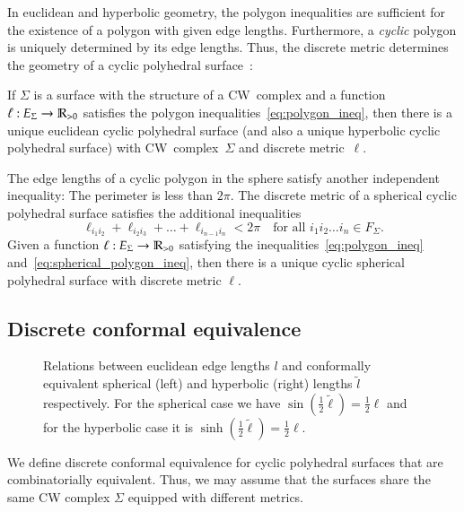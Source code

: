 \documentclass[Thesis]{subfiles}
\begin{document}
In euclidean and hyperbolic geometry, the polygon inequalities are sufficient for the existence of a polygon with given edge lengths. 
Furthermore, a \emph{cyclic} polygon is uniquely determined by its edge lengths. 
Thus, the discrete metric determines the geometry of a cyclic polyhedral surface~\cite{KSS15}:

If $\Sigma$ is a surface with the structure of a CW~complex and a function $\ell:E_{\Sigma}\rightarrow\mathbb R_{>0}$ satisfies the polygon inequalities~\eqref{eq:polygon_ineq}, then there is a unique euclidean
cyclic polyhedral surface (and also a unique hyperbolic cyclic polyhedral surface) with CW~complex~$\Sigma$ and discrete metric~$\ell$.

The edge lengths of a cyclic polygon in the sphere satisfy another independent inequality: The perimeter is less than $2\pi$.  
The discrete metric of a spherical cyclic polyhedral surface satisfies the additional inequalities
\begin{equation}
\label{eq:spherical_polygon_ineq}
\ell_{i_{1}i_{2}}+\ell_{i_{2}i_{3}}+\ldots+\ell_{i_{n-1}i_{n}}<2\pi
\quad
\text{for all $i_{1}i_{2}\ldots i_{n}\in F_{\Sigma}$.}
\end{equation}
Given a function $\ell:E_{\Sigma}\rightarrow\mathbb R_{>0}$ satisfying the inequalities~\eqref{eq:polygon_ineq}
and~\eqref{eq:spherical_polygon_ineq}, then there is a unique cyclic spherical polyhedral surface with discrete metric $\ell$.

\subsection{Discrete conformal equivalence}
\label{sec:discr-conf-equiv}

\begin{figure}
\centering
\resizebox{0.6\textwidth}{!}{


}
\caption{
Relations between euclidean edge lengths $l$ and conformally equivalent spherical (left) and hyperbolic (right) lengths $\tilde l$ respectively. 
For the spherical case we have $\sin(\frac{1}{2}\tilde \ell)=\frac{1}{2}\ell$ and for the hyperbolic case it is $\sinh(\frac{1}{2}\tilde \ell)=\frac{1}{2}\ell$.
}
\label{fig:geometries}
\end{figure}


We define discrete conformal equivalence for cyclic polyhedral surfaces that are combinatorially equivalent. Thus, we may assume that the surfaces share the same CW complex $\Sigma$ equipped with different metrics.
\end{document}
